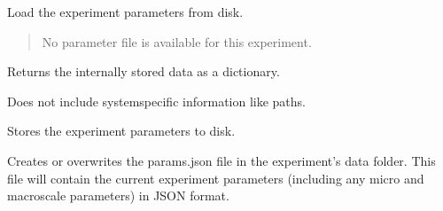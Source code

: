 \documentclass[letterpaper,10pt,english]{sphinxmanual}
\begin{document}
\begin{fulllineitems}
\begin{fulllineitems}
\begin{quote}
\begin{description}
\begin{description}
\end{description}


\end{description}\end{quote}

\end{fulllineitems}


\begin{fulllineitems}
\label{\detokenize{lysis.util:lysis.util.parameters.Experiment.read_file}}
\pysigstartsignatures
{}
\pysigstopsignatures
\sphinxAtStartPar
Load the experiment parameters from disk.
\begin{quote}\begin{description}
\sphinxAtStartPar
{} \textendash{} No parameter file is available for this experiment.

\end{description}\end{quote}

\end{fulllineitems}


\begin{fulllineitems}
\label{\detokenize{lysis.util:lysis.util.parameters.Experiment.to_dict}}
\pysigstartsignatures
{}
\pysigstopsignatures
\sphinxAtStartPar
Returns the internally stored data as a dictionary.

\sphinxAtStartPar
Does not include system\sphinxhyphen{}specific information like paths.

\end{fulllineitems}


\begin{fulllineitems}
\label{\detokenize{lysis.util:lysis.util.parameters.Experiment.to_file}}
\pysigstartsignatures
{}
\pysigstopsignatures
\sphinxAtStartPar
Stores the experiment parameters to disk.

\sphinxAtStartPar
Creates or overwrites the params.json file in the experiment’s data
folder. This file will contain the current experiment parameters
(including any micro\sphinxhyphen{} and macroscale parameters) in JSON format.

\end{fulllineitems}


\end{fulllineitems}
\end{document}
